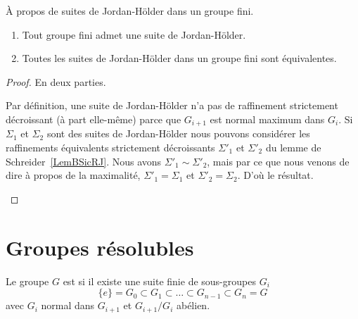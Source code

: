 \begin{theorem}\label{ThoLgxWIC}
	À propos de suites de Jordan-Hölder dans un groupe fini.
	\begin{enumerate}
		\item       \label{ITEMooRSDDooNHkFYO}
		      Tout groupe fini admet une suite de Jordan-Hölder.
		\item       \label{ITEMooGBOCooBAgnyt}
		      Toutes les suites de Jordan-Hölder dans un groupe fini sont équivalentes.
	\end{enumerate}
\end{theorem}

\begin{proof}
	En deux parties.
	\begin{subproof}

		Par définition, une suite de Jordan-Hölder n'a pas de raffinement strictement décroissant (à part elle-même) parce que \( G_{i+1}\) est normal maximum dans \( G_i\). Si \( \Sigma_1\) et \( \Sigma_2\) sont des suites de Jordan-Hölder nous pouvons considérer les raffinements équivalents strictement décroissants \( \Sigma'_1\) et \( \Sigma'_2\) du lemme de Schreider~\ref{LemBSicRJ}. Nous avons \( \Sigma'_1\sim\Sigma'_2\), mais par ce que nous venons de dire à propos de la maximalité, \( \Sigma'_1=\Sigma_1\) et \( \Sigma'_2=\Sigma_2\). D'où le résultat.
	\end{subproof}
\end{proof}

\section{Groupes résolubles}

\begin{definition}  \label{DefOSYNooTROIKs}
	Le groupe \( G\) est  si il existe une suite finie de sous-groupes \( G_i\)
	\begin{equation}
		\{ e \}=G_0\subset G_1\subset\ldots\subset G_{n-1}\subset G_n=G
	\end{equation}
	avec \( G_{i}\) normal dans \( G_{i+1}\) et \( G_{i+1}/G_i\) abélien.
\end{definition}

